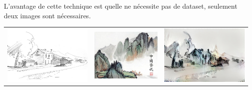 \documentclass[a4paper, 12pt]{book}
\begin{document}
L'avantage de cette technique est quelle ne nécessite pas de dataset, seulement deux images sont nécessaires.

\begin{center}
  \centering
  \begin{tabular}{ccc}
    \includegraphics[height=0.15\textheight]{images/transfert-style_1.jpg}&
    \includegraphics[height=0.15\textheight]{images/transfert-style_3.jpg}&
    \includegraphics[height=0.15\textheight]{images/transfert-style_2.jpg}\\

\end{tabular}
\end{center}
\end{document}
